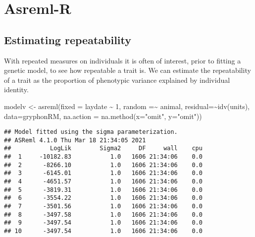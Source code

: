 \documentclass[
  12pt,
]{book}
\newenvironment{Shaded}{\begin{snugshade}}{\end{snugshade}}
\newcommand{\AttributeTok}[1]{\textcolor[rgb]{0.77,0.63,0.00}{#1}}
\newcommand{\DecValTok}[1]{\textcolor[rgb]{0.00,0.00,0.81}{#1}}
\newcommand{\FunctionTok}[1]{\textcolor[rgb]{0.00,0.00,0.00}{#1}}
\newcommand{\NormalTok}[1]{#1}
\newcommand{\OtherTok}[1]{\textcolor[rgb]{0.56,0.35,0.01}{#1}}
\newcommand{\SpecialCharTok}[1]{\textcolor[rgb]{0.00,0.00,0.00}{#1}}
\newcommand{\StringTok}[1]{\textcolor[rgb]{0.31,0.60,0.02}{#1}}
\begin{document}
\hypertarget{asreml-r-2}{%
\section{Asreml-R}\label{asreml-r-2}}

\hypertarget{estimating-repeatability}{%
\subsection{Estimating repeatability}\label{estimating-repeatability}}

With repeated measures on individuals it is often of interest, prior to fitting a genetic model, to see how repeatable a trait is. We can estimate the repeatability of a trait as the proportion of phenotypic variance explained by individual identity.

\begin{Shaded}
\begin{Highlighting}[]
\NormalTok{modelv }\OtherTok{\textless{}{-}} \FunctionTok{asreml}\NormalTok{(}\AttributeTok{fixed =}\NormalTok{ laydate }\SpecialCharTok{\textasciitilde{}} \DecValTok{1}\NormalTok{,}
                 \AttributeTok{random =}\SpecialCharTok{\textasciitilde{}}\NormalTok{ animal,}
                 \AttributeTok{residual=}\SpecialCharTok{\textasciitilde{}}\FunctionTok{idv}\NormalTok{(units),}
                 \AttributeTok{data=}\NormalTok{gryphonRM,}
                 \AttributeTok{na.action =} \FunctionTok{na.method}\NormalTok{(}\AttributeTok{x=}\StringTok{"omit"}\NormalTok{, }\AttributeTok{y=}\StringTok{"omit"}\NormalTok{))}
\end{Highlighting}
\end{Shaded}

\begin{verbatim}
## Model fitted using the sigma parameterization.
## ASReml 4.1.0 Thu Mar 18 21:34:05 2021
##           LogLik        Sigma2     DF     wall    cpu
##  1     -10182.83           1.0   1606 21:34:06    0.0
##  2      -8266.10           1.0   1606 21:34:06    0.0
##  3      -6145.01           1.0   1606 21:34:06    0.0
##  4      -4651.57           1.0   1606 21:34:06    0.0
##  5      -3819.31           1.0   1606 21:34:06    0.0
##  6      -3554.22           1.0   1606 21:34:06    0.0
##  7      -3501.56           1.0   1606 21:34:06    0.0
##  8      -3497.58           1.0   1606 21:34:06    0.0
##  9      -3497.54           1.0   1606 21:34:06    0.0
## 10      -3497.54           1.0   1606 21:34:06    0.0
\end{verbatim}
\end{document}
